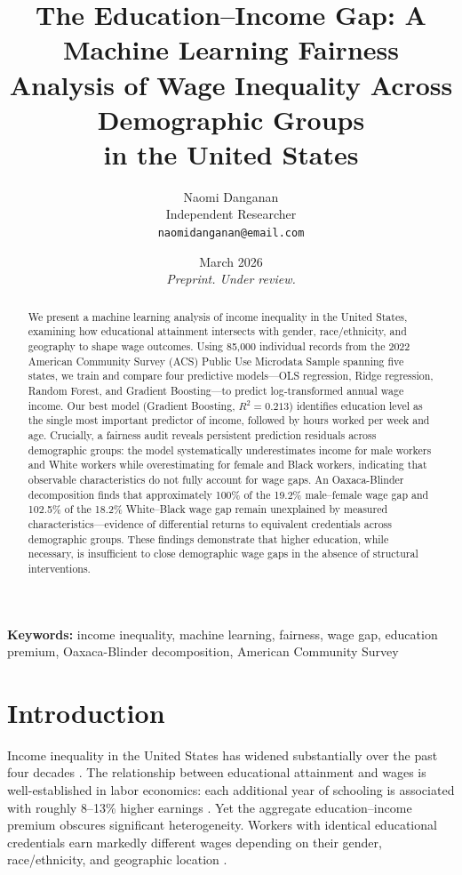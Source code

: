\documentclass[11pt]{article}
\title{\textbf{The Education--Income Gap: A Machine Learning Fairness\\
Analysis of Wage Inequality Across Demographic Groups\\
in the United States}}
\author{
    Naomi Danganan\\
    \small Independent Researcher\\
    \small \texttt{naomidanganan@email.com}
}
\date{\small March 2026 \\ \vspace{0.3em}
\small \textit{Preprint. Under review.}}
\begin{document}
\maketitle

\begin{abstract}
\noindent
We present a machine learning analysis of income inequality in the United States,
examining how educational attainment intersects with gender, race/ethnicity, and
geography to shape wage outcomes. Using 85,000 individual records from the 2022
American Community Survey (ACS) Public Use Microdata Sample spanning five states,
we train and compare four predictive models---OLS regression, Ridge regression,
Random Forest, and Gradient Boosting---to predict log-transformed annual wage income.
Our best model (Gradient Boosting, $R^2 = 0.213$) identifies education level as the
single most important predictor of income, followed by hours worked per week and age.
Crucially, a fairness audit reveals persistent prediction residuals across demographic
groups: the model systematically underestimates income for male workers and White workers
while overestimating for female and Black workers, indicating that observable
characteristics do not fully account for wage gaps. An Oaxaca-Blinder decomposition
finds that approximately 100\% of the 19.2\% male--female wage gap and 102.5\% of the
18.2\% White--Black wage gap remain unexplained by measured characteristics---evidence
of differential returns to equivalent credentials across demographic groups.
These findings demonstrate that higher education, while necessary, is insufficient
to close demographic wage gaps in the absence of structural interventions.
\end{abstract}

\vspace{0.5em}
\noindent\textbf{Keywords:} income inequality, machine learning, fairness, wage gap,
education premium, Oaxaca-Blinder decomposition, American Community Survey

\section{Introduction}

Income inequality in the United States has widened substantially over the past
four decades \citep{piketty2015wealth}. The relationship between educational
attainment and wages is well-established in labor economics: each additional year
of schooling is associated with roughly 8--13\% higher earnings \citep{card1999causal}.
Yet the aggregate education--income premium obscures significant heterogeneity.
Workers with identical educational credentials earn markedly different wages
depending on their gender, race/ethnicity, and geographic location
\citep{blau2017gender, autor2014skills}.
\end{document}

